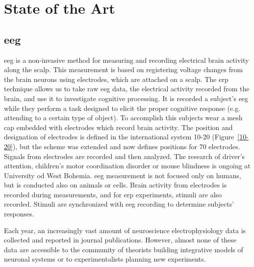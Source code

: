\chapter {State of the Art}

\section{\gls{eeg}}
\gls{eeg} is a non-invasive method for measuring and recording electrical brain activity along the scalp. This measurement is based on registering voltage changes from the brain neurons using electrodes, which are attached on a scalp. The \gls{erp} technique allows us to take raw \gls{eeg} data, the electrical activity recorded from the brain, and use it to investigate cognitive processing. It is recorded a subject's \gls{eeg} while they perform a task designed to elicit the proper cognitive response (e.g. attending to a certain type of object). To accomplish this subjects wear a mesh cap embedded with electrodes which record brain activity. \cite{erpinfo} The position and designation of electrodes is defined in the international system 10-20 (Figure~\ref{10-20}), but the scheme was extended and now defines positions for 70 electrodes. Signals from electrodes are recorded and then analyzed. The research of driver's attention, children's motor coordination disorder or mouse blindness is ongoing at University od West Bohemia. \gls{eeg} measurement is not focused only on humans, but is conducted also on animals or cells. Brain activity from electrodes is recorded during measurements, and for \gls{erp} experiments, stimuli are also recorded. Stimuli are synchronized with \gls{eeg} recording to determine subjects' responses.

Each year, an increasingly vast amount of neuroscience electrophysiology data is collected and reported in journal publications. However, almost none of these data are accessible to the community of theorists building integrative models of neuronal systems or to experimentalists planning new experiments. \cite{incf_mission}

